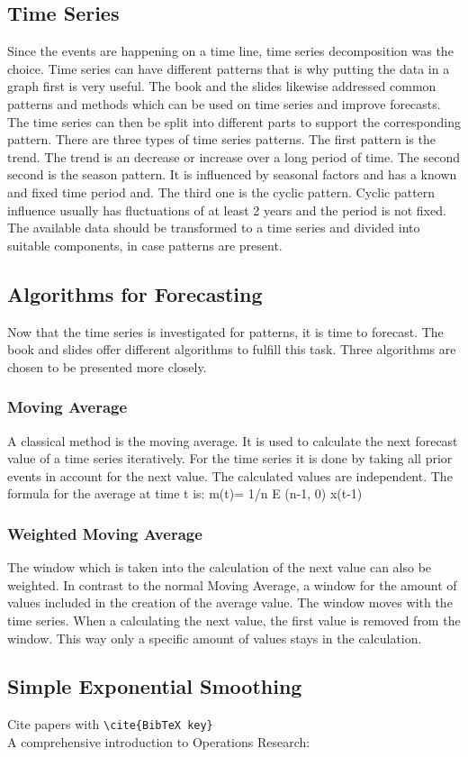 \subsection{Time Series}\label{subsection:Time Series}
Since the events are happening on a time line, time series decomposition was the choice. Time series can have different patterns that is why putting the data in a graph first is very useful. The book and the slides likewise addressed common patterns and methods which can be used on time series and improve forecasts.
The time series can then be split into different parts to support the corresponding pattern. There are three types of time series patterns. The first pattern is the trend. The trend is an decrease or increase over a long period of time. The second second is the season pattern. It is influenced by seasonal factors and has a known and fixed time period and. The third one is the cyclic pattern. Cyclic pattern influence usually has fluctuations of at least 2 years and the period is not fixed. The available data should be transformed to a time series and divided into suitable components, in case patterns are present.
\subsection{Algorithms for Forecasting}\label{subsection:Algorithms for Forecasting}
Now that the time series is investigated for patterns, it is time to forecast. The book and slides offer different algorithms to fulfill this task. Three algorithms are chosen to be presented more closely.
\subsubsection{Moving Average}\label{section:Moving Average}
A classical method is the moving average. It is used to calculate the next forecast value of a time series iteratively. For the time series it is done by taking all prior events in account for the next value. The calculated values are independent. The formula for the average at time t is: m(t)= 1/n E (n-1, 0) x(t-1)
\subsubsection{Weighted Moving Average}\label{section:Weighted Moving Average}
The window which is taken into the calculation of the next value can also be weighted. In contrast to the normal Moving Average, a window for the amount of values included in the creation of the average value. The window moves with the time series. When a calculating the next value, the first value is removed from the window. This way only a specific amount of values stays in the calculation.
\subsection{Simple Exponential Smoothing}\label{section:Simple Exponential Smoothing}

Cite papers with \verb+\cite{BibTeX key}+\\
A comprehensive introduction to Operations Research: \cite{Winston.2007}
